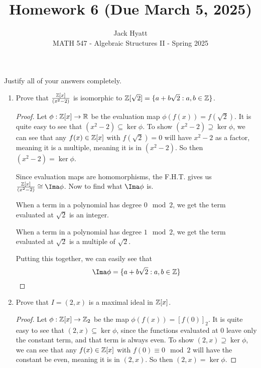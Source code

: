 \documentclass[12pt]{article}
\begin{document}
	
	
	
	\title{Homework 6 (Due March 5, 2025)}
	\author{Jack Hyatt\\ %
		MATH 547 - Algebraic Structures II - Spring 2025} 
	
	\maketitle
	
	Justify all of your answers completely.\\
	
	
	\medskip 
	
	\begin{enumerate}
		\item Prove that $\frac{\mathbb{Z}[x]}{(x^2-2)}$ is isomorphic to $\mathbb{Z}[\sqrt{2}] = \{a + b\sqrt{2} : a,b \in \mathbb{Z}\}$.
		\begin{proof}
			Let $\phi:\mathbb{Z}[x] \rightarrow \mathbb{R}$ be the evaluation map $\phi(f(x)) = f(\sqrt{2})$. It is quite easy to see that $(x^2-2) \subseteq \ker \phi$. To show $(x^2-2) \supseteq \ker \phi$, we can see that any $f(x) \in \mathbb{Z}[x]$ with $f(\sqrt{2}) = 0$ will have $x^2-2$ as a factor, meaning it is a multiple, meaning it is in $(x^2-2)$. So then $(x^2-2) = \ker \phi$.
			
			Since evaluation maps are homomorphisms, the F.H.T. gives us $\frac{\Z[x]}{(x^2-2)} \cong \Ima\phi$. Now to find what $\Ima\phi$ is.
			
			When a term in a polynomial has degree $0 \mod 2$, we get the term evaluated at $\sqrt{2}$ is an integer. 
			
			When a term in a polynomial has degree $1 \mod 2$, we get the term evaluated at $\sqrt{2}$ is a multiple of $\sqrt{2}$.
			
			Putting this together, we can easily see that 
			\[\Ima\phi = \{a + b\sqrt{2} : a,b \in \Z\}\]
		\end{proof}
		
		
		\item Prove that $I = (2,x)$ is a maximal ideal in $\mathbb{Z}[x]$.
		\begin{proof}
			Let $\phi:\mathbb{Z}[x] \rightarrow \mathbb{Z}_2$ be the map $\phi(f(x)) = [f(0)]_2$. It is quite easy to see that $(2,x) \subseteq \ker \phi$, since the functions evaluated at 0 leave only the constant term, and that term is always even. To show $(2,x) \supseteq \ker \phi$, we can see that any $f(x) \in \mathbb{Z}[x]$ with $f(0) \equiv 0 \mod 2$ will have the constant be even, meaning it is in $(2,x)$. So then $(2,x) = \ker \phi$.
			

\end{proof}
\end{enumerate}
\end{document}
